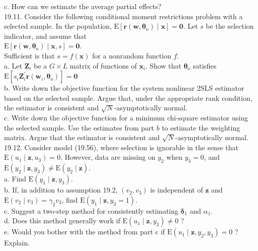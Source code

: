 \documentclass[10pt]{article}
\begin{document}
c. How can we estimate the average partial effects?\\
19.11. Consider the following conditional moment restrictions problem with a selected sample. In the population, $\mathrm{E}\left[\mathbf{r}\left(\mathbf{w}, \boldsymbol{\theta}_{\mathrm{o}}\right) \mid \mathbf{x}\right]=\mathbf{0}$. Let $s$ be the selection indicator, and assume that\\
$\mathrm{E}\left[\mathbf{r}\left(\mathbf{w}, \boldsymbol{\theta}_{\mathrm{o}}\right) \mid \mathbf{x}, s\right]=\mathbf{0}$.\\
Sufficient is that $s=f(\mathbf{x})$ for a nonrandom function $f$.\\
a. Let $\mathbf{Z}_{i}$ be a $G \times L$ matrix of functions of $\mathbf{x}_{i}$. Show that $\boldsymbol{\theta}_{\mathrm{o}}$ satisfies $\mathrm{E}\left[s_{i} \mathbf{Z}_{i}^{\prime} \mathbf{r}\left(\mathbf{w}_{i}, \boldsymbol{\theta}_{\mathrm{o}}\right)\right]=\mathbf{0}$\\
b. Write down the objective function for the system nonlinear 2SLS estimator based on the selected sample. Argue that, under the appropriate rank condition, the estimator is consistent and $\sqrt{N}$-asymptotically normal.\\
c. Write down the objective function for a minimum chi-square estimator using the selected sample. Use the estimates from part $b$ to estimate the weighting matrix. Argue that the estimator is consistent and $\sqrt{N}$-asymptotically normal.\\
19.12. Consider model (19.56), where selection is ignorable in the sense that $\mathrm{E}\left(u_{1} \mid \mathbf{z}, u_{3}\right)=0$. However, data are missing on $y_{2}$ when $y_{3}=0$, and $\mathrm{E}\left(y_{2} \mid \mathbf{z}, y_{3}\right) \neq \mathrm{E}\left(y_{2} \mid \mathbf{z}\right)$.\\
a. Find $\mathrm{E}\left(y_{1} \mid \mathbf{z}, y_{3}\right)$.\\
b. If, in addition to assumption 19.2, $\left(v_{2}, v_{3}\right)$ is independent of $\mathbf{z}$ and $\mathrm{E}\left(v_{2} \mid v_{3}\right)= \gamma_{2} v_{3}$, find $\mathrm{E}\left(y_{1} \mid \mathbf{z}, y_{3}=1\right)$.\\
c. Suggest a two-step method for consistently estimating $\boldsymbol{\delta}_{1}$ and $\alpha_{1}$.\\
d. Does this method generally work if $\mathrm{E}\left(u_{1} \mid \mathbf{z}, y_{3}\right) \neq 0$ ?\\
e. Would you bother with the method from part c if $\mathrm{E}\left(u_{1} \mid \mathbf{z}, y_{2}, y_{3}\right)=0$ ? Explain.\\
\end{document}
